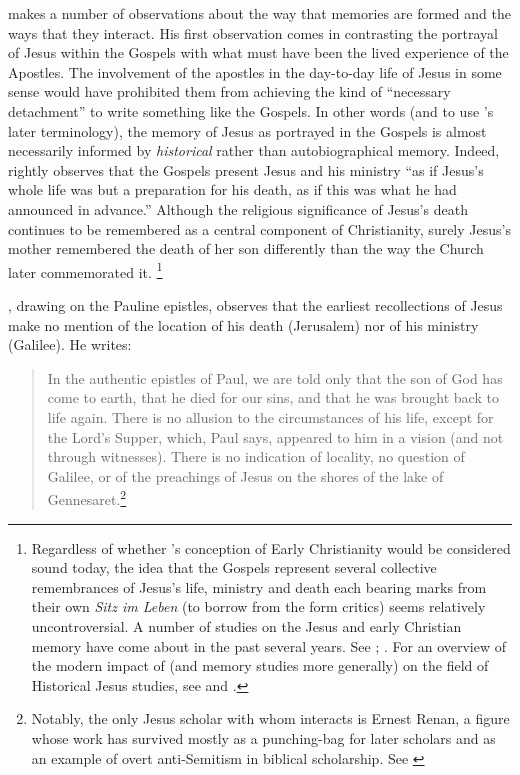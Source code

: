 \halbwachs makes a number of observations about the way that memories are formed and the ways that they interact. His first observation comes in contrasting the portrayal of Jesus within the Gospels with what must have been the lived experience of the Apostles.\autocite[193--198]{halbwachs1992} The involvement of the apostles in the day-to-day life of Jesus in some sense would have prohibited them from achieving the kind of ``necessary detachment'' to write something like the Gospels. In other words (and to use \halbwachs's later terminology), the memory of Jesus as portrayed in the Gospels is almost necessarily informed by \emph{historical} rather than autobiographical memory.\autocite[194]{halbwachs1992} Indeed, \halbwachs rightly observes that the Gospels present Jesus and his ministry ``as if Jesus's whole life was but a preparation for his death, as if this was what he had announced in advance.''\autocite[198]{halbwachs1992} Although the religious significance of Jesus's death continues to be remembered as a central component of Christianity, surely Jesus's mother remembered the death of her son differently than the way the Church later commemorated it.%
%
\footnote{Regardless of whether \halbwachs's conception of Early Christianity would be considered sound today, the idea that the Gospels represent several collective remembrances of Jesus's life, ministry and death each bearing marks from their own \emph{Sitz im Leben} (to borrow from the form critics) seems relatively uncontroversial. A number of studies on the Jesus and early Christian memory have come about in the past several years. See \cite{ledonne2009}; \cite{rodriguez2010}. For an overview of the modern impact of \halbwachs (and memory studies more generally) on the field of Historical Jesus studies, see \cite{keith_ec2015} and \cite{keith_ec2015b}.}

\halbwachs, drawing on the Pauline epistles, observes that the earliest recollections of Jesus make no mention of the location of his death (Jerusalem) nor of his ministry (Galilee). He writes:  

\begin{quote}
    In the authentic epistles of Paul, we are told only that the son of God has come to earth, that he died for our sins, and that he was brought back to life again. There is no allusion to the circumstances of his life, except for the Lord's Supper, which, Paul says, appeared to him in a vision (and not through witnesses). There is no indication of locality, no question of Galilee, or of the preachings of Jesus on the shores of the lake of Gennesaret.\autocite[209]{halbwachs1992}\footnote{Notably, the only Jesus scholar with whom \halbwachs interacts is Ernest Renan, a figure whose work has survived mostly as a punching-bag for later scholars and as an example of overt anti-Semitism in biblical scholarship. See \cite[39]{heschel2008}}
\end{quote}  

